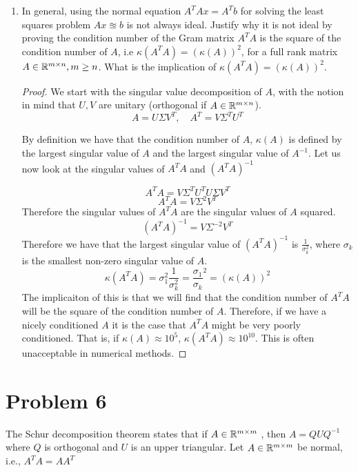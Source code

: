 \documentclass{article}
\begin{document}
\begin{enumerate}
\item In general, using the normal equation $A^TAx = A^Tb$ for solving the least squares problem $Ax \approxeq b$ is not always ideal. Justify why it is not ideal by proving the condition number of the Gram matrix $A^TA$ is the square of the condition number of $A$, i.e $\kappa(A^TA) = (\kappa(A))^2$, for a full rank matrix $A \in \mathbb{R}^{m\times n}, m \ge n$. What is the implication of $\kappa(A^TA) = (\kappa(A))^2$.

\begin{proof}

We start with the singular value decomposition of $A$, with the notion in mind that $U, V$ are unitary (orthogonal if $A \in \mathbb{R}^{m\times n}$). 
\[
    A = U\Sigma V^T, \quad A^T = V\Sigma^T U^T
\]

By definition we have that the condition number of $A$, $\kappa(A)$ is defined by the largest singular value of $A$ and the largest singular value of $A^{-1}$. Let us now look at the singular values of $A^TA$ and $(A^TA)^{-1}$ 

\[
    A^TA = V\Sigma^T U^T U \Sigma V^T
\]
\[
    A^TA = V\Sigma^2 V^T
\]
Therefore the singular values of $A^TA$ are the singular values of $A$ squared. 
\[
    (A^TA)^{-1} = V\Sigma^{-2}V^{T}
\]
Therefore we have that the largest singular value of $(A^TA)^{-1}$ is $\frac{1}{\sigma_k^2}$, where $\sigma_k$ is the smallest non-zero singular value of $A$. 
\[
    \kappa(A^TA) = \sigma_1^2 \frac{1}{\sigma_k^2} = \frac{\sigma_1}{\sigma_k}^2 = (\kappa(A))^2
\]
The implicaiton of this is that we will find that the condition number of $A^TA$ will be the square of the condition number of $A$. Therefore, if we have a nicely conditioned $A$ it is the case that $A^TA$ might be very poorly conditioned. That is, if $\kappa(A) \approx 10^5$, $\kappa(A^TA) \approx 10^{10}$. This is often unacceptable in numerical methods. 

\end{proof}


\end{enumerate}

\section{Problem 6 }
The Schur decomposition theorem states that if $A \in \mathbb{R}^{m\times m}$ , then $A = QUQ^{-1}$ where $Q$ is orthogonal and $U$ is an upper triangular. Let $A\in \mathbb{R}^{m\times m}$ be normal, i.e., $A^T A = AA^T $
\end{document}
